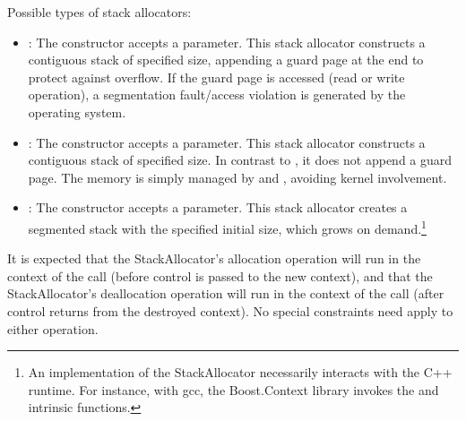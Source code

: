 Possible types of stack allocators:
\begin{itemize}
    \item {}: The constructor accepts a 
          parameter. This stack allocator constructs a contiguous stack of
          specified size, appending a guard page at the end to protect against
          overflow. If the guard page is accessed (read or write operation), a
          segmentation fault/access violation is generated by the operating
          system.
    \item {}: The constructor accepts a  parameter.
          This stack allocator constructs a contiguous stack of specified size.
          In contrast to , it does not append a guard
          page. The memory is simply managed by 
          and , avoiding kernel involvement.
    \item {}: The constructor accepts a  parameter.
          This stack allocator creates a segmented stack\cite{gccsplit} with the
          specified initial size, which grows on demand.\footnote{An
          implementation of the  StackAllocator necessarily
          interacts with the C++ runtime. For instance, with gcc, the
          Boost.Context\cite{bcontext} library invokes
          the 
          and  intrinsic
          functions.\cite{splitalloc}\citecomma\cite{bctxseg}}
\end{itemize}

It is expected that the StackAllocator's allocation operation will run in the
context of the \callcc call (before control is passed to the new context), and
that the StackAllocator's deallocation operation will run in the context of
the \dtor call (after control returns from the destroyed
context). No special constraints need apply to either operation.
